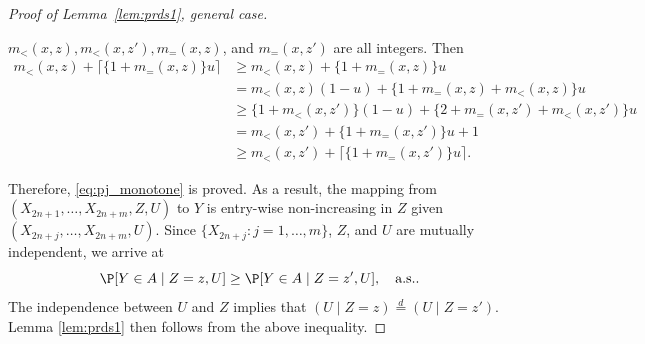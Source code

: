 \begin{proof}[Proof of Lemma~\ref{lem:prds1}, general case]
\begin{enumerate}[{Case} 1: ]
$m_{<}(x, z), m_{<}(x, z'), m_{=}(x, z)$, and $m_{=}(x, z')$ are all integers. Then
\begin{align*}
 m_{<}(x, z) + \lceil \{1 + m_{=}(x, z)\}u\rceil
&\ge m_{<}(x, z) + \{1 + m_{=}(x, z)\}u \\
&= m_{<}(x, z)(1 - u) + \{1 + m_{=}(x, z) + m_{<}(x, z)\}u\\
&\ge \{1 + m_{<}(x, z')\}(1 - u) + \{2 + m_{=}(x, z') + m_{<}(x, z')\}u\\
& = m_{<}(x, z') + \{1 + m_{=}(x, z')\}u + 1\\
& \ge m_{<}(x, z') + \lceil\{1 + m_{=}(x, z')\}u\rceil.
\end{align*}
\end{enumerate}
Therefore, \eqref{eq:pj_monotone} is proved. As a result, the mapping from $(X_{2n+1}, \ldots, X_{2n+m}, Z, U)$ to $Y$ is entry-wise non-increasing in $Z$ given $(X_{2n+j}, \ldots, X_{2n+m}, U)$. Since $\{X_{2n+j}: j = 1,\ldots,m\}$, $Z$, and $U$ are mutually independent, we arrive at
\[\P[Y\in A \mid Z = z, U]\ge \P[Y\in A \mid Z = z', U], \quad \text{a.s.}.\]
The independence between $U$ and $Z$ implies that $(U\mid Z = z) \stackrel{d}{=} (U\mid Z = z')$.  Lemma \ref{lem:prds1} then follows from the above inequality.
\end{proof}

